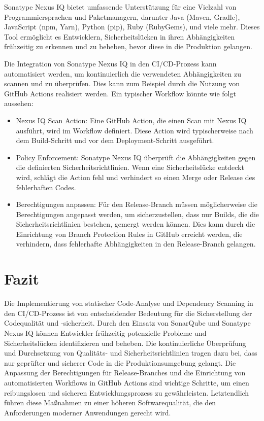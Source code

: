 \documentclass[conference,compsoc,final,a4paper]{IEEEtran}
\begin{document}
Sonatype Nexus IQ bietet umfassende Unterstützung für eine Vielzahl von Programmiersprachen und Paketmanagern, darunter Java (Maven, Gradle), JavaScript (npm, Yarn), Python (pip), Ruby (RubyGems), und viele mehr. Dieses Tool ermöglicht es Entwicklern, Sicherheitslücken in ihren Abhängigkeiten frühzeitig zu erkennen und zu beheben, bevor diese in die Produktion gelangen.

Die Integration von Sonatype Nexus IQ in den CI/CD-Prozess kann automatisiert werden, um kontinuierlich die verwendeten Abhängigkeiten zu scannen und zu überprüfen. Dies kann zum Beispiel durch die Nutzung von GitHub Actions realisiert werden. Ein typischer Workflow könnte wie folgt aussehen:

\begin{itemize}
\item Nexus IQ Scan Action: Eine GitHub Action, die einen Scan mit Nexus IQ ausführt, wird im Workflow definiert. Diese Action wird typischerweise nach dem Build-Schritt und vor dem Deployment-Schritt ausgeführt.
\item Policy Enforcement: Sonatype Nexus IQ überprüft die Abhängigkeiten gegen die definierten Sicherheitsrichtlinien. Wenn eine Sicherheitslücke entdeckt wird, schlägt die Action fehl und verhindert so einen Merge oder Release des fehlerhaften Codes.
\item Berechtigungen anpassen: Für den Release-Branch müssen möglicherweise die Berechtigungen angepasst werden, um sicherzustellen, dass nur Builds, die die Sicherheitsrichtlinien bestehen, gemergt werden können. Dies kann durch die Einrichtung von Branch Protection Rules in GitHub erreicht werden, die verhindern, dass fehlerhafte Abhängigkeiten in den Release-Branch gelangen.
\end{itemize}


\section{Fazit}
Die Implementierung von statischer Code-Analyse und Dependency Scanning in den CI/CD-Prozess ist von entscheidender Bedeutung für die Sicherstellung der Codequalität und -sicherheit. Durch den Einsatz von SonarQube und Sonatype Nexus IQ können Entwickler frühzeitig potenzielle Probleme und Sicherheitslücken identifizieren und beheben. Die kontinuierliche Überprüfung und Durchsetzung von Qualitäts- und Sicherheitsrichtlinien tragen dazu bei, dass nur geprüfter und sicherer Code in die Produktionsumgebung gelangt. Die Anpassung der Berechtigungen für Release-Branches und die Einrichtung von automatisierten Workflows in GitHub Actions sind wichtige Schritte, um einen reibungslosen und sicheren Entwicklungsprozess zu gewährleisten. Letztendlich führen diese Maßnahmen zu einer höheren Softwarequalität, die den Anforderungen moderner Anwendungen gerecht wird.
\end{document}

